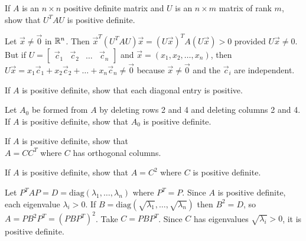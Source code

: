 \documentclass{ximera}
\begin{document}
\begin{problem}\label{prob:pos_def_6}
If $A$ is an $n \times n$ positive definite matrix and $U$ is an $n \times m$ matrix of rank $m$, show that $U^{T}AU$ is positive definite.

\begin{hint}
Let $\vec{x} \neq \vec{0}$ in $\mathbb{R}^n$. Then $\vec{x}^{T}(U^{T}AU)\vec{x} = (U\vec{x})^{T}A(U\vec{x}) > 0$ provided $U\vec{x} \neq 0$. But if $U = \left[ \begin{array}{cccc}
\vec{c}_{1} & \vec{c}_{2} & \dots &  \vec{c}_{n}
\end{array}\right]$ and $\vec{x} = (x_{1}, x_{2}, \dots, x_{n})$, then $U\vec{x} = x_{1}\vec{c}_{1} + x_{2}\vec{c}_{2} + \dots  + x_{n}\vec{c}_{n} \neq \vec{0}$ because $\vec{x} \neq \vec{0}$ and the $\vec{c}_{i}$ are independent.
\end{hint}
\end{problem}

\begin{problem}\label{prob:pos_def_7}
If $A$ is positive definite, show that each diagonal entry is positive.
\end{problem}

\begin{problem}\label{prob:pos_def_8}
Let $A_{0}$ be formed from $A$ by deleting rows 2 and 4 and deleting columns 2 and 4. If $A$ is positive definite, show that $A_{0}$ is positive definite.
\end{problem}

\begin{problem}\label{prob:pos_def_9}
If $A$ is positive definite, show that \\ $A = CC^{T}$ where $C$ has orthogonal columns.
\end{problem}

\begin{problem}\label{prob:pos_def_10}
If $A$ is positive definite, show that $A = C^{2}$ where $C$ is positive definite.

\begin{hint}
Let $P^{T}AP = D = \mbox{diag}(\lambda_{1}, \dots, \lambda_{n})$ where $P^{T} = P$. Since $A$ is positive definite, each eigenvalue $\lambda_{i} > 0$. If $B = \mbox{diag}(\sqrt{\lambda_{1}}, \dots, \sqrt{\lambda_{n}})$ then $B^{2} = D$, so $A = PB^{2}P^{T} = (PBP^{T})^{2}$. Take $C = PBP^{T}$. Since $C$ has eigenvalues $\sqrt{\lambda_{i}} > 0$, it is positive definite.
\end{hint}
\end{problem}
\end{document}
